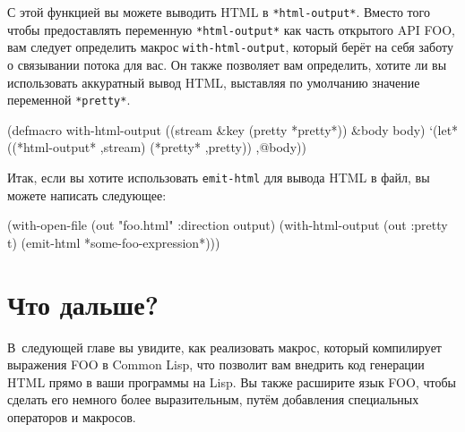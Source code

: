 С этой функцией вы можете выводить HTML в \lstinline{*html-output*}. Вместо того чтобы
предоставлять переменную \lstinline{*html-output*} как часть открытого API FOO, вам следует
определить макрос \lstinline{with-html-output}, который берёт на себя заботу о связывании
потока для вас. Он также позволяет вам определить, хотите ли вы использовать аккуратный
вывод HTML, выставляя по умолчанию значение переменной \lstinline{*pretty*}.

\begin{myverb}
(defmacro with-html-output ((stream &key (pretty *pretty*)) &body body)
  `(let* ((*html-output* ,stream)
          (*pretty* ,pretty))
    ,@body))
\end{myverb}

Итак, если вы хотите использовать \lstinline{emit-html} для вывода HTML в файл, вы можете
написать следующее:

\begin{myverb}
(with-open-file (out "foo.html" :direction output)
  (with-html-output (out :pretty t)
    (emit-html *some-foo-expression*)))
\end{myverb}

\section{Что дальше?}

В~следующей главе вы увидите, как реализовать макрос, который компилирует выражения FOO в
Common Lisp, что позволит вам внедрить код генерации HTML прямо в ваши программы на Lisp. Вы
также расширите язык FOO, чтобы сделать его немного более выразительным, путём добавления
специальных операторов и макросов.

